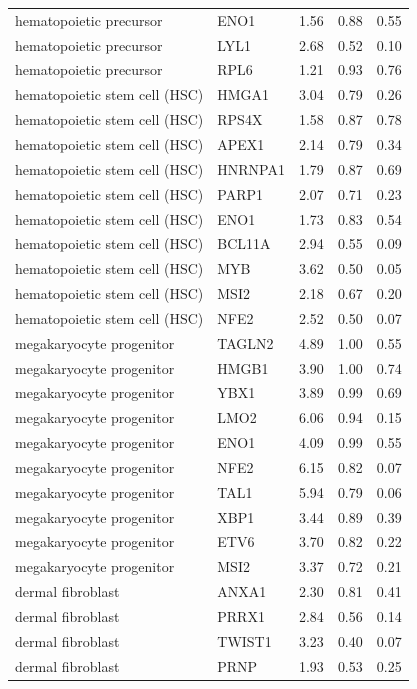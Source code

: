 \begin{longtable}{llccc}
hematopoietic precursor & ENO1 & 1.56 & 0.88 & 0.55 \\
hematopoietic precursor & LYL1 & 2.68 & 0.52 & 0.10 \\
hematopoietic precursor & RPL6 & 1.21 & 0.93 & 0.76 \\
hematopoietic stem cell (HSC) & HMGA1 & 3.04 & 0.79 & 0.26 \\
hematopoietic stem cell (HSC) & RPS4X & 1.58 & 0.87 & 0.78 \\
hematopoietic stem cell (HSC) & APEX1 & 2.14 & 0.79 & 0.34 \\
hematopoietic stem cell (HSC) & HNRNPA1 & 1.79 & 0.87 & 0.69 \\
hematopoietic stem cell (HSC) & PARP1 & 2.07 & 0.71 & 0.23 \\
hematopoietic stem cell (HSC) & ENO1 & 1.73 & 0.83 & 0.54 \\
hematopoietic stem cell (HSC) & BCL11A & 2.94 & 0.55 & 0.09 \\
hematopoietic stem cell (HSC) & MYB & 3.62 & 0.50 & 0.05 \\
hematopoietic stem cell (HSC) & MSI2 & 2.18 & 0.67 & 0.20 \\
hematopoietic stem cell (HSC) & NFE2 & 2.52 & 0.50 & 0.07 \\
megakaryocyte progenitor & TAGLN2 & 4.89 & 1.00 & 0.55 \\
megakaryocyte progenitor & HMGB1 & 3.90 & 1.00 & 0.74 \\
megakaryocyte progenitor & YBX1 & 3.89 & 0.99 & 0.69 \\
megakaryocyte progenitor & LMO2 & 6.06 & 0.94 & 0.15 \\
megakaryocyte progenitor & ENO1 & 4.09 & 0.99 & 0.55 \\
megakaryocyte progenitor & NFE2 & 6.15 & 0.82 & 0.07 \\
megakaryocyte progenitor & TAL1 & 5.94 & 0.79 & 0.06 \\
megakaryocyte progenitor & XBP1 & 3.44 & 0.89 & 0.39 \\
megakaryocyte progenitor & ETV6 & 3.70 & 0.82 & 0.22 \\
megakaryocyte progenitor & MSI2 & 3.37 & 0.72 & 0.21 \\
dermal fibroblast & ANXA1 & 2.30 & 0.81 & 0.41 \\
dermal fibroblast & PRRX1 & 2.84 & 0.56 & 0.14 \\
dermal fibroblast & TWIST1 & 3.23 & 0.40 & 0.07 \\
dermal fibroblast & PRNP & 1.93 & 0.53 & 0.25 \\

\end{longtable}
